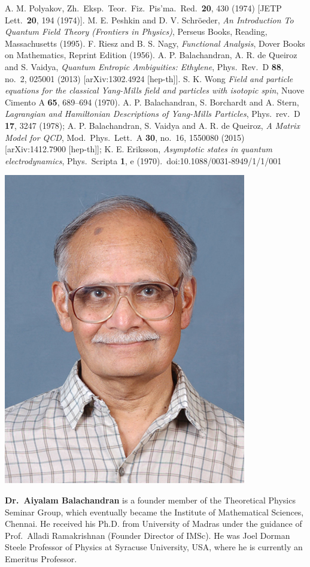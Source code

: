 \begin{thebibliography}{99}
A. M. Polyakov, Zh.\ Eksp.\ Teor.\ Fiz.\ Pis'ma.\ Red.\ \textbf{20}, 430 (1974) [JETP Lett.\ \textbf{20}, 194 (1974)].
 M. E. Peshkin and D. V. Schr\"oeder, \textit{An Introduction To Quantum Field Theory (Frontiers in Physics)}, Perseus Books, Reading, Massachusetts (1995).
 F. Riesz and B. S. Nagy, \textit{Functional Analysis}, Dover Books on Mathematics, Reprint Edition (1956).
 A. P. Balachandran, A. R. de Queiroz and S. Vaidya, \textit{Quantum Entropic Ambiguities: Ethylene}, Phys.\ Rev.\ D \textbf{88}, no.\ 2, 025001 (2013) [arXiv:1302.4924 [hep-th]].
 S. K. Wong \textit{Field and particle equations for the classical Yang-Mills field and particles with isotopic spin}, Nuove Cimento A \textbf{65}, 689--694 (1970).
 A. P. Balachandran, S. Borchardt and A. Stern, \textit{Lagrangian and Hamiltonian Descriptions of Yang-Mills Particles}, Phys.\ rev.\ D \textbf{17}, 3247 (1978);
 A. P. Balachandran, S. Vaidya and A. R. de Queiroz, \textit{A Matrix Model for QCD}, Mod.\ Phys.\ Lett.\ A \textbf{30}, no.\ 16, 1550080 (2015) [arXiv:1412.7900 [hep-th]];
 K. E. Eriksson, \textit{Asymptotic states in quantum electrodynamics}, Phys.\ Scripta \textbf{1}, e (1970).\ doi:10.1088/0031-8949/1/1/001
\end{thebibliography}
\newpage


\centerline{\includegraphics[scale=1]{authorsphotos/A._P._Balachandran.jpg}}
\bigskip

\noindent
\textbf{Dr.\ Aiyalam Balachandran} is a founder member of the Theoretical Physics Seminar Group, which eventually became the Institute of Mathematical Sciences, Chennai.  He received his Ph.D. from University of Madras under the guidance of Prof.\ Alladi Ramakrishnan (Founder Director of IMSc). He was Joel Dorman Steele Professor of Physics at Syracuse University, USA, where he is currently an Emeritus Professor.

